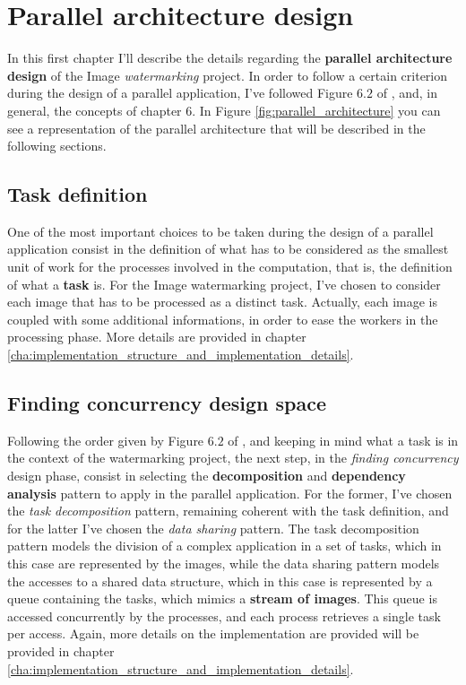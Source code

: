 \chapter{Parallel architecture design} %
\label{cha:parallel_architecture_design}
    In this first chapter I'll describe the details regarding the \textbf{parallel architecture design} of
    the Image \textit{watermarking} project. In order to follow a certain criterion during the design of a
    parallel application, I've followed Figure $6.2$ of \cite{DSPM}, and, in general, the
    concepts of chapter $6$. In Figure \ref{fig:parallel_architecture} you can see a representation of the
    parallel architecture that will be described in the following sections.

    \section{Task definition} %
    \label{sec:task_definition}
        One of the most important choices to be taken during the design of a parallel application consist in the
        definition of what has to be considered as the smallest unit of work for the processes involved in the
        computation, that is, the definition of what a \textbf{task} is. For the Image watermarking project,
        I've chosen to consider each image that has to be processed as a distinct task. Actually, each image is
        coupled with some additional informations, in order to ease the workers in the processing phase. More
        details are provided in chapter \ref{cha:implementation_structure_and_implementation_details}.

    \section{Finding concurrency design space} %
    \label{sec:finding_concurrency_design_space}
        Following the order given by Figure $6.2$ of \cite{DSPM}, and keeping in mind what a task is in the
        context of the watermarking project, the next step, in the \textit{finding concurrency} design phase,
        consist in selecting the \textbf{decomposition} and \textbf{dependency analysis} pattern to apply in the
        parallel application. For the former, I've chosen the \textit{task decomposition} pattern, remaining
        coherent with the task definition, and for the latter I've chosen the \textit{data sharing} pattern.
        The task decomposition pattern models the division of a complex application in a set of tasks, which in
        this case are represented by the images, while the data sharing pattern models the accesses to a shared
        data structure, which in this case is represented by a queue containing the tasks, which mimics a
        \textbf{stream of images}. This queue is accessed concurrently by the processes, and each
        process retrieves a single task per access. Again, more details on the implementation are provided
        will be provided in chapter \ref{cha:implementation_structure_and_implementation_details}.

